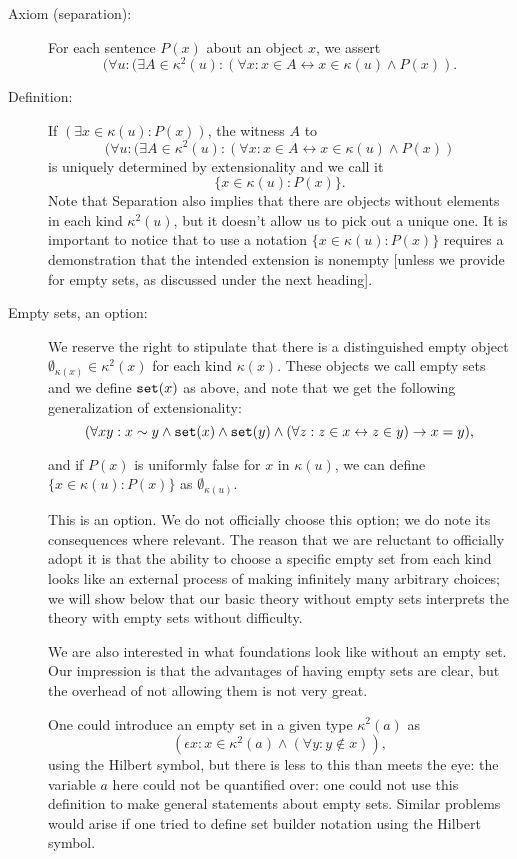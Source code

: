 \documentclass[12pt]{article}
\begin{document}
\begin{description}
\item[Axiom (separation):]   For each sentence $P(x)$ about an object $x$, we assert $$(\forall u:(\exists A \in \kappa^2(u):(\forall x:x\in A \leftrightarrow x \in \kappa(u) \wedge P(x)).$$


\item[Definition:]  If $(\exists x \in \kappa(u):P(x))$, the witness $A$ to $$(\forall u:(\exists A \in \kappa^2(u):(\forall x:x\in A \leftrightarrow x \in \kappa(u) \wedge P(x))$$ is uniquely determined by extensionality and we call it $$\{x \in \kappa(u):P(x)\}.$$  Note that Separation also implies that there are objects without elements in each kind $\kappa^2(u)$, but it doesn't allow us to pick out a unique one.  It is important to notice that to use a notation $\{x \in \kappa(u):P(x)\}$ requires a demonstration that the intended extension is nonempty [unless we provide for empty sets, as discussed under the next heading].

\item[Empty sets, an option:]  We reserve the right to stipulate that there is a distinguished empty object $\emptyset_{\kappa(x)} \in \kappa^2(x)$ for each kind $\kappa(x)$.  These objects we call empty sets and we define ${\tt set}(x)$ as above, and note that we get the following generalization of extensionality: $$(\forall xy: x\sim y \wedge {\tt set}(x) \wedge {\tt set}(y) \wedge(\forall z:z \in x \leftrightarrow z \in y) \rightarrow x=y),$$

and if $P(x)$ is uniformly false for $x$ in $\kappa(u)$, we can define \newline$\{x \in \kappa(u):P(x)\}$ as $\emptyset_{\kappa(u)}$.

This is an option.  We do not officially choose this option;  we do note its consequences where relevant.  The reason that we are reluctant to officially adopt it is that the ability to choose a specific empty set from each kind looks like an external process of making infinitely many arbitrary choices;  we will show below that our basic theory without empty sets interprets the theory with empty sets without difficulty.

We are also interested in what foundations look like without an empty set.  Our impression is that the advantages of having empty sets are clear, but the overhead of not allowing them is not very great.

One could introduce an empty set in a given type $\kappa^2(a)$ as $$(\epsilon x:x \in \kappa^2(a) \wedge (\forall y:y \not\in x)),$$  using the Hilbert symbol, but there is less to this than meets the eye:  the variable $a$ here could not be quantified over:  one could not use this definition to make general statements about empty sets.  Similar problems would arise if one tried to define set builder notation using the Hilbert symbol.

\end{description}
\end{document}
